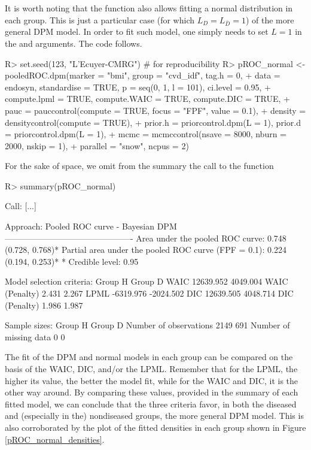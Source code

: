 It is worth noting that the function  also allows fitting a normal distribution in each group. This is just a particular case (for which $L_D=L_{\bar{D}}=1$) of the more general DPM model. In order to fit such model, one simply needs to set $L=1$ in the  and  arguments. The code follows.
\begin{example}
R> set.seed(123, "L'Ecuyer-CMRG") # for reproducibility
R> pROC_normal <- pooledROC.dpm(marker = "bmi", group = "cvd_idf", tag.h = 0, 
+ data = endosyn, standardise = TRUE, p = seq(0, 1, l = 101), ci.level = 0.95, 
+ compute.lpml = TRUE, compute.WAIC = TRUE, compute.DIC = TRUE,
+ pauc = pauccontrol(compute = TRUE, focus = "FPF", value = 0.1), 
+ density = densitycontrol(compute = TRUE), 
+ prior.h = priorcontrol.dpm(L = 1), prior.d = priorcontrol.dpm(L = 1), 
+ mcmc = mcmccontrol(nsave = 8000, nburn = 2000, nskip = 1),
+ parallel = "snow", ncpus = 2)
\end{example}
For the sake of space, we omit from the summary the call to the function
\begin{example}
R> summary(pROC_normal)
\end{example}
\begin{example}
Call: [...]

Approach: Pooled ROC curve - Bayesian DPM
----------------------------------------------
Area under the pooled ROC curve: 0.748 (0.728, 0.768)*
Partial area under the pooled ROC curve (FPF = 0.1): 0.224 (0.194, 0.253)*
 * Credible level:  0.95

Model selection criteria:
                     Group H       Group D
WAIC               12639.952      4049.004
WAIC (Penalty)         2.431         2.267
LPML               -6319.976     -2024.502
DIC                12639.505      4048.714
DIC (Penalty)          1.986         1.987


Sample sizes:
                           Group H     Group D
Number of observations        2149         691
Number of missing data           0           0
\end{example}
The fit of the DPM and normal models in each group can be compared on the basis of the WAIC, DIC, and/or the LPML. Remember that for the LPML, the higher its value, the better the model fit, while for the WAIC and DIC, it is the other way around. By comparing these values, provided in the summary of each fitted model, we can conclude that the three criteria favor, in both the diseased and (especially in the) nondiseased groups, the more general DPM model. This is also corroborated by the plot of the fitted densities in each group shown in Figure \ref{pROC_normal_densities}.

